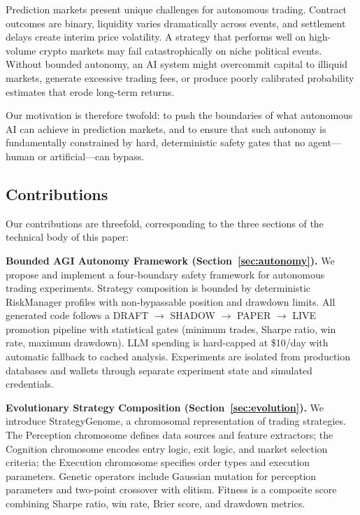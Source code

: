 \documentclass[11pt]{article}
\begin{document}
Prediction markets present unique challenges for autonomous trading. Contract outcomes are binary, liquidity varies dramatically across events, and settlement delays create interim price volatility. A strategy that performs well on high-volume crypto markets may fail catastrophically on niche political events. Without bounded autonomy, an AI system might overcommit capital to illiquid markets, generate excessive trading fees, or produce poorly calibrated probability estimates that erode long-term returns.

Our motivation is therefore twofold: to push the boundaries of what autonomous AI can achieve in prediction markets, and to ensure that such autonomy is fundamentally constrained by hard, deterministic safety gates that no agent---human or artificial---can bypass.

\subsection{Contributions}\label{sec:intro:contributions}

Our contributions are threefold, corresponding to the three sections of the technical body of this paper:

\textbf{Bounded AGI Autonomy Framework (Section~\ref{sec:autonomy}).} We propose and implement a four-boundary safety framework for autonomous trading experiments. Strategy composition is bounded by deterministic RiskManager profiles with non-bypassable position and drawdown limits. All generated code follows a DRAFT $\rightarrow$ SHADOW $\rightarrow$ PAPER $\rightarrow$ LIVE promotion pipeline with statistical gates (minimum trades, Sharpe ratio, win rate, maximum drawdown). LLM spending is hard-capped at \$10/day with automatic fallback to cached analysis. Experiments are isolated from production databases and wallets through separate experiment state and simulated credentials.

\textbf{Evolutionary Strategy Composition (Section~\ref{sec:evolution}).} We introduce StrategyGenome, a chromosomal representation of trading strategies. The Perception chromosome defines data sources and feature extractors; the Cognition chromosome encodes entry logic, exit logic, and market selection criteria; the Execution chromosome specifies order types and execution parameters. Genetic operators include Gaussian mutation for perception parameters and two-point crossover with elitism. Fitness is a composite score combining Sharpe ratio, win rate, Brier score, and drawdown metrics.
\end{document}
